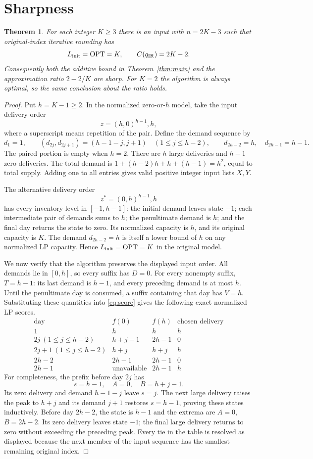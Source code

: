\documentclass[11pt]{article}
\newtheorem{theorem}{Theorem}
\newcommand{\OPT}{\operatorname{OPT}}
\begin{document}
\section{Sharpness}\label{sec:sharpness}
\begin{theorem}\label{thm:tight}
For each integer $K\ge3$ there is an input with $n=2K-3$ such that
original-index iterative rounding has
\[
L_{\rm init}=\OPT=K,\qquad C(q_{\rm IR})=2K-2.
\]
Consequently both the additive bound in Theorem~\ref{thm:main} and the
approximation ratio $2-2/K$ are sharp. For $K=2$ the algorithm is always
optimal, so the same conclusion about the ratio holds.
\end{theorem}
\begin{proof}
Put $h=K-1\ge2$. In the normalized zero-or-$h$ model, take the input
delivery order
\[
z=(h,0)^{h-1},h,
\]
where a superscript means repetition of the pair. Define the demand sequence by
\[
d_1=1,\qquad
(d_{2j},d_{2j+1})=(h-1-j,j+1)\quad(1\le j\le h-2),
\qquad d_{2h-2}=h,\quad d_{2h-1}=h-1.
\]
The paired portion is empty when $h=2$. There are $h$ large deliveries and
$h-1$ zero deliveries. The total demand is
$1+(h-2)h+h+(h-1)=h^2$, equal to total supply.
Adding one to all entries gives valid positive integer input lists $X,Y$.

The alternative delivery order
\[
z^*=(0,h)^{h-1},h
\]
has every inventory level in $[-1,h-1]$: the initial demand leaves state
$-1$; each intermediate pair of demands sums to $h$; the penultimate demand
is $h$; and the final day returns the state to zero. Its normalized capacity
is $h$, and its original capacity is $K$. The demand $d_{2h-2}=h$ is itself
a lower bound of $h$ on any normalized LP capacity. Hence
$L_{\rm init}=\OPT=K$ in the original model.

We now verify that the algorithm preserves the displayed input order.
All demands lie in $[0,h]$, so every suffix has $D=0$. For every nonempty
suffix, $T=h-1$: its last demand is $h-1$, and every preceding demand is
at most $h$. Until the penultimate day is consumed, a suffix containing
that day has $V=h$. Substituting these quantities into
\eqref{eq:score} gives the following exact normalized LP scores.
\[
\begin{array}{c|c|c|c}
\text{day}&f(0)&f(h)&\text{chosen delivery}\\\hline
1&h&h&h\\
2j\ (1\le j\le h-2)&h+j-1&2h-1&0\\
2j+1\ (1\le j\le h-2)&h+j&h+j&h\\
2h-2&2h-1&2h-1&0\\
2h-1&\text{unavailable}&2h-1&h
\end{array}
\]
For completeness, the prefix before day $2j$ has
\[
s=h-1,\quad A=0,\quad B=h+j-1.
\]
Its zero delivery and demand $h-1-j$ leave $s=j$. The next large delivery
raises the peak to $h+j$ and its demand $j+1$ restores $s=h-1$,
proving these states inductively. Before day $2h-2$, the state is $h-1$
and the extrema are $A=0$, $B=2h-2$. Its zero delivery leaves state $-1$;
the final large delivery returns to zero without exceeding the preceding peak.
Every tie in the table is resolved as displayed because the next member of
the input sequence has the smallest remaining original index.


\end{proof}
\end{document}
